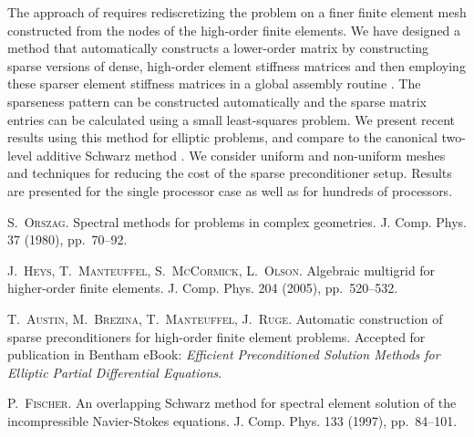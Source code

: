 The approach of \cite{Ors1980,Heys2005} requires rediscretizing the problem on a finer finite element mesh constructed from the nodes of the high-order finite elements.  We have designed a method that automatically constructs a lower-order matrix by constructing sparse versions of dense, high-order element stiffness matrices and then employing these sparser element stiffness matrices in a global assembly routine \cite{Aus2011}.  The sparseness pattern can be constructed automatically and the sparse matrix entries can be calculated using a small least-squares problem.  We present recent results using this method for elliptic problems, and compare to the canonical two-level additive Schwarz method \cite{Fis1997}.  We consider uniform and non-uniform meshes and techniques for reducing the cost of the sparse preconditioner setup.  Results are presented for the single processor case as well as for hundreds of processors.


\begin{thebibliography}{10}
\textsc{S.~Orszag}. {Spectral methods for problems in complex geometries}. J. Comp. Phys. 37 (1980), pp.~70--92.

\textsc{J.~Heys, T.~Manteuffel, S.~McCormick, L.~Olson}. {Algebraic multigrid for higher-order finite elements}. J. Comp. Phys. 204 (2005),  pp.~520--532.

\textsc{T.~Austin, M.~Brezina, T.~Manteuffel, J.~Ruge}. {Automatic construction of sparse preconditioners for high-order finite element problems.} Accepted for publication in Bentham eBook: {\em Efficient Preconditioned Solution Methods for Elliptic Partial Differential Equations}. 

\textsc{P.~Fischer}. {An overlapping Schwarz method for spectral element solution of the incompressible Navier-Stokes equations.} J. Comp. Phys. 133  (1997), pp.~84--101.
\end{thebibliography}